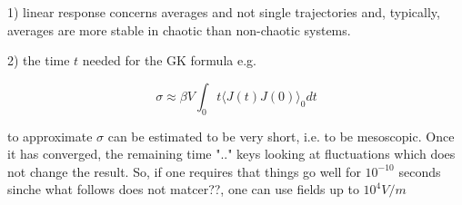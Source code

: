 \documentclass{article}
\begin{document}
1) linear response concerns averages and not single trajectories and, typically, averages are more stable in chaotic than non-chaotic systems.

2) the time $t$ needed for the GK formula e.g.

$$ \sigma \approx \beta V \int_{0}{t} \langle J(t) J(0) \rangle_0 dt $$

to approximate $\sigma$ can be estimated to be very short, i.e. to be mesoscopic. Once it has converged, the remaining time ".." keys looking at fluctuations which does not change the result. So, if one requires that things go well for $10^{-10}$ seconds sinche what follows does not matcer??, one can use fields up to $10^4 V/m$
\end{document}
